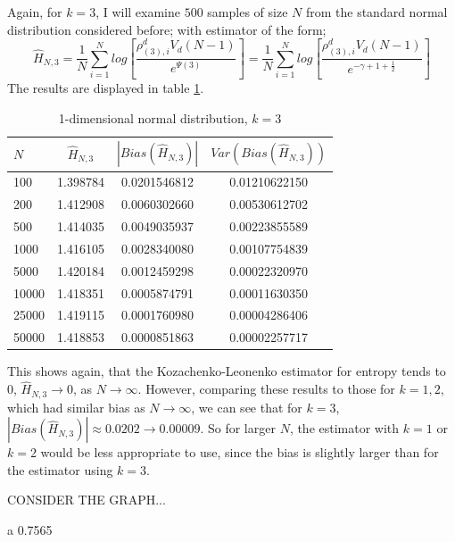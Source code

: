 \documentclass{article}
\begin{document}
Again, for $k=3$, I will examine $500$ samples of size $N$ from the standard normal distribution considered before; with estimator of the form;
\begin{equation}
\hat{H}_{N, 3} = \frac{1}{N} \sum_{i=1}^{N} log \left[ \frac{\rho_{(3),i}^{d} V_{d} (N-1)}{e^{\Psi(3)}} \right] = \frac{1}{N} \sum_{i=1}^{N} log \left[ \frac{\rho_{(3),i}^{d} V_{d} (N-1)}{e^{-\gamma + 1 + \frac{1}{2}}} \right] \nonumber
\end{equation}
The results are displayed in table \ref{normal_k=3_table}. 

\begin{table}
\caption{1-dimensional normal distribution, $k=3$} \label{normal_k=3_table}
\begin{center}
\begin{tabular}{| l | c c c|} 
\toprule
$N$ & $\hat{H}_{N, 3}$ & $|Bias(\hat{H}_{N, 3})|$ & $Var(Bias(\hat{H}_{N, 3}))$ \\
\midrule[1pt]
100     & 1.398784     & 0.0201546812     & 0.01210622150  \\
200     & 1.412908     & 0.0060302660     & 0.00530612702  \\
500     & 1.414035     & 0.0049035937     & 0.00223855589  \\
1000    & 1.416105     & 0.0028340080     & 0.00107754839  \\
5000    & 1.420184     & 0.0012459298     & 0.00022320970  \\
10000   & 1.418351     & 0.0005874791     & 0.00011630350  \\
25000   & 1.419115     & 0.0001760980     & 0.00004286406  \\
50000   & 1.418853     & 0.0000851863     & 0.00002257717  \\
\hline
\end{tabular}
\end{center}
\end{table}

This shows again, that the Kozachenko-Leonenko estimator for entropy tends to 0, $\hat{H}_{N, 3} \to 0$, as $N \to \infty$. However, comparing these results to those for $k=1, 2$, which had similar bias as $N \to \infty$, we can see that for $k=3$, $|Bias(\hat{H}_{N, 3})| \approx 0.0202 \to 0.00009$. So for larger $N$, the estimator with $k=1$ or $k=2$ would be less appropriate to use, since the bias is slightly larger than for the estimator using $k=3$.

CONSIDER THE GRAPH...


a
0.7565
\end{document}
